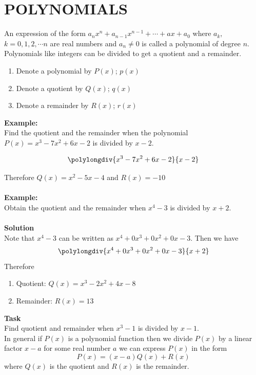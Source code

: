 \documentclass[11pt,a4paper]{article}
\begin{document}
\section{POLYNOMIALS}
An expression of the form $a_nx^n+a_{n-1}x^{n-1}+\cdots+ax+a_0$ where $a_k,$ $k=0,1,2,\cdots n$ are real numbers and $a_n\neq 0$ is called a polynomial of degree $n$.\\
Polynomials like integers can be divided to get a quotient and a remainder.
\begin{enumerate}
\item[$\bullet$] Denote a polynomial by $P(x)$; $p(x)$
\item[$\bullet$] Denote a quotient by $Q(x)$; $q(x)$
\item[$\bullet$] Denote a remainder by $R(x)$; $r(x)$\\
\end{enumerate}



\textbf{Example:}\\
Find the quotient and the remainder when the polynomial $P(x)=x^3-7x^2+6x-2$ is divided by $x-2$.

$$\polylongdiv{x^3-7x^2+6x-2}{x-2}$$

Therefore $Q(x)=x^2-5x-4$ and $R(x)=-10$\\\\

\textbf{Example:}\\
Obtain the quotient and the remainder when $x^4-3$ is divided by $x+2$.\\\\

\textbf{Solution}\\
Note that $x^4-3$ can be written as $x^4+0x^3+0x^2+0x-3$.
Then we have
$$\polylongdiv{x^4+0x^3+0x^2+0x-3}{x+2}$$
Therefore
\begin{enumerate}
\item[] Quotient: $Q(x)=x^3-2x^2+4x-8$
\item[] Remainder: $R(x)=13$\\
\end{enumerate}


\textbf{Task}\\
Find quotient and remainder when $x^3-1$ is divided by $x-1$.\\


In general if $P(x)$ is a polynomial function then we divide $P(x)$ by a linear factor $x-a$ for some real number $a$ we can express $P(x)$ in the form $$P(x)=(x-a)Q(x)+R(x)$$ where $Q(x)$ is the quotient and $R(x)$ is the remainder.\\
\end{document}
